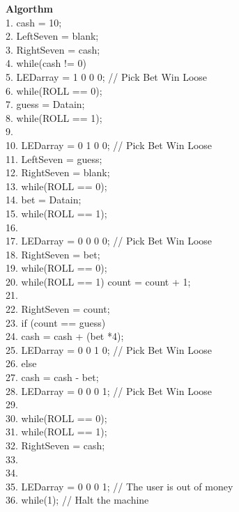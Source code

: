 \documentclass{article}[10 pt,landscape]
\begin{document}
{\bf Algorthm}
{\small 
\\
 1. cash = 10; \\
 2. LeftSeven = blank; 	\\
 3. RightSeven = cash; 	\\
 4. while(cash != 0) { 	\\
 5.     LEDarray = 1 0 0 0;    // Pick Bet Win Loose 	\\
 6.     while(ROLL == 0); 	\\
 7.     guess = Datain; 	\\
 8.     while(ROLL == 1); 	\\
 9.      	\\
10.     LEDarray = 0 1 0 0;    // Pick Bet Win Loose 	\\
11.     LeftSeven = guess; 	\\
12.     RightSeven = blank; 	\\
13.     while(ROLL == 0); 	\\
14.     bet = Datain; 	\\
15.     while(ROLL == 1); 	\\
16.      	\\
17.     LEDarray = 0 0 0 0;    // Pick Bet Win Loose 	\\
18.     RightSeven = bet; 	\\
19.     while(ROLL == 0); 	\\
20.     while(ROLL == 1) count = count + 1; 	\\
21.  	\\
22.     RightSeven = count; 	\\
23.     if (count == guess) { 	\\
24.         cash = cash + (bet *4); 	\\
25.         LEDarray = 0 0 1 0;    // Pick Bet Win Loose 	\\
26.     } else { 	\\
27.         cash = cash - bet; 	\\
28.         LEDarray = 0 0 0 1;    // Pick Bet Win Loose 	\\
29.     } 	\\
30.     while(ROLL == 0); 	\\
31.     while(ROLL == 1); 	\\
32.     RightSeven = cash; 	\\
33.  	\\
34. }	 	\\
35. LEDarray = 0 0 0 1;    // The user is out of money 	\\
36. while(1);		// Halt the machine 	\\
}
 
\end{document}
